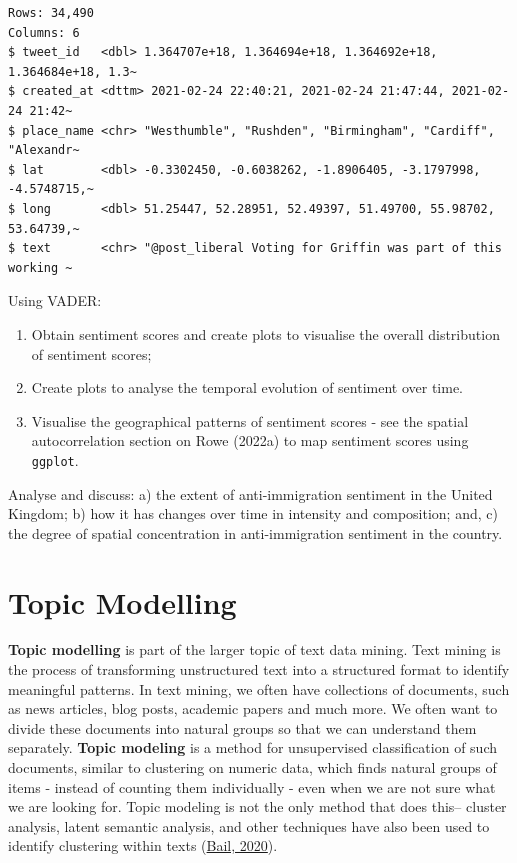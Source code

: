 \documentclass[
  letterpaper,
  DIV=11,
  numbers=noendperiod]{scrreprt}
\begin{document}
\begin{verbatim}
Rows: 34,490
Columns: 6
$ tweet_id   <dbl> 1.364707e+18, 1.364694e+18, 1.364692e+18, 1.364684e+18, 1.3~
$ created_at <dttm> 2021-02-24 22:40:21, 2021-02-24 21:47:44, 2021-02-24 21:42~
$ place_name <chr> "Westhumble", "Rushden", "Birmingham", "Cardiff", "Alexandr~
$ lat        <dbl> -0.3302450, -0.6038262, -1.8906405, -3.1797998, -4.5748715,~
$ long       <dbl> 51.25447, 52.28951, 52.49397, 51.49700, 55.98702, 53.64739,~
$ text       <chr> "@post_liberal Voting for Griffin was part of this working ~
\end{verbatim}

Using VADER:

\begin{enumerate}
\def\labelenumi{\arabic{enumi}.}
\item
  Obtain sentiment scores and create plots to visualise the overall
  distribution of sentiment scores;
\item
  Create plots to analyse the temporal evolution of sentiment over time.
\item
  Visualise the geographical patterns of sentiment scores - see the
  spatial autocorrelation section on Rowe (2022a) to map sentiment
  scores using \texttt{ggplot}.
\end{enumerate}

Analyse and discuss: a) the extent of anti-immigration sentiment in the
United Kingdom; b) how it has changes over time in intensity and
composition; and, c) the degree of spatial concentration in
anti-immigration sentiment in the country.


\hypertarget{sec-chp7}{%
\chapter{Topic Modelling}\label{sec-chp7}}

\textbf{Topic modelling} is part of the larger topic of text data
mining. Text mining is the process of transforming unstructured text
into a structured format to identify meaningful patterns. In text
mining, we often have collections of documents, such as news articles,
blog posts, academic papers and much more. We often want to divide these
documents into natural groups so that we can understand them separately.
\textbf{Topic modeling} is a method for unsupervised classification of
such documents, similar to clustering on numeric data, which finds
natural groups of items - instead of counting them individually - even
when we are not sure what we are looking for. Topic modeling is not the
only method that does this-- cluster analysis, latent semantic analysis,
and other techniques have also been used to identify clustering within
texts
(\href{https://sicss.io/2020/materials/day3-text-analysis/topic-modeling/rmarkdown/Topic_Modeling.html}{Bail,
2020}).
\end{document}
